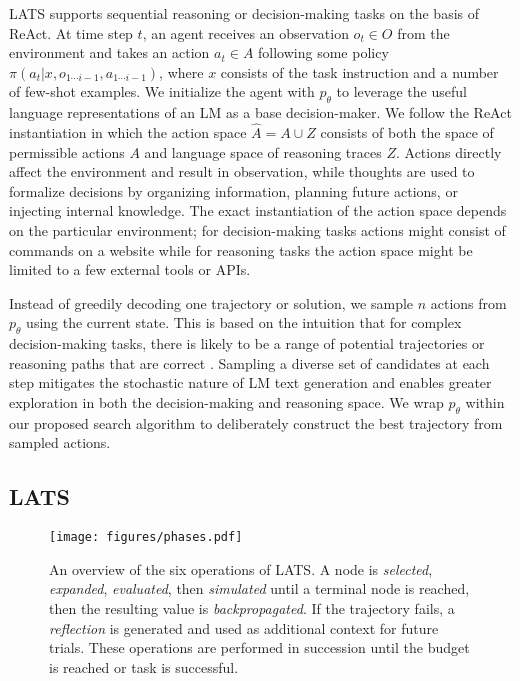 \documentclass{article} \usepackage{iclr2024_conference,times}
\begin{document}
LATS supports sequential reasoning or decision-making tasks on the basis of ReAct. At time step $t$, an agent receives an observation $o_t \in O$ from the environment and takes an action $a_t \in A$ following some policy $\pi(a_t | x, o_{1\cdots i-1}, a_{1\cdots i-1})$, where $x$ consists of the task instruction and a number of few-shot examples. We initialize the agent with $p_\theta$ to leverage the useful language representations of an LM as a base decision-maker. We follow the ReAct instantiation in which the action space $\hat{A} = A \cup Z$ consists of both the space of permissible actions $A$ and language space of reasoning traces $Z$. Actions directly affect the environment and result in observation, while thoughts are used to formalize decisions by organizing information, planning future actions, or injecting internal knowledge. The exact instantiation of the action space depends on the particular environment; for decision-making tasks actions might consist of commands on a website while for reasoning tasks the action space might be limited to a few external tools or APIs.

Instead of greedily decoding one trajectory or solution, we sample $n$ actions from $p_\theta$ using the current state. This is based on the intuition that for complex decision-making tasks, there is likely to be a range of potential trajectories or reasoning paths that are correct \citep{evans2010intuition}. Sampling a diverse set of candidates at each step mitigates the stochastic nature of LM text generation and enables greater exploration in both the decision-making and reasoning space. We wrap $p_\theta$ within our proposed search algorithm to deliberately construct the best trajectory from sampled actions.

\subsection{LATS}
\label{sec:LATS}
\begin{figure}[t]
    \centering
    \texttt{[image: figures/phases.pdf]}
    \vspace{-0.3in}
    \caption{An overview of the six operations of LATS. A node is \textit{selected}, \textit{expanded}, \textit{evaluated}, then \textit{simulated} until a terminal node is reached, then the resulting value is \textit{backpropagated}. If the trajectory fails, a \textit{reflection} is generated and used as additional context for future trials. These operations are performed in succession until the budget is reached or task is successful.}
    \vspace{-0.2in}
    \label{fig:phases}
\end{figure}
\end{document}
